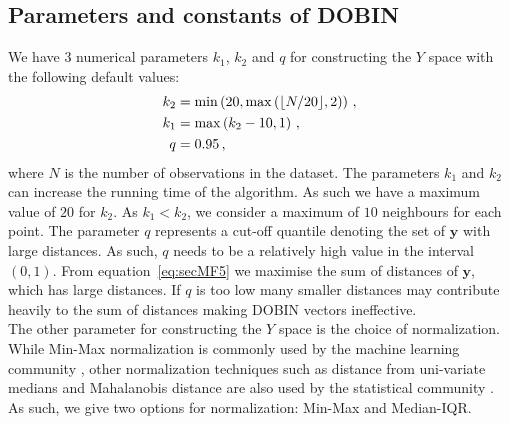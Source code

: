 \documentclass[11pt]{article}
\begin{document}
\subsection{Parameters and constants of DOBIN}\label{sec:MathFrame4}
We have $3$ numerical parameters $k_1$, $k_2$ and $q$ for constructing the $Y$ space with the following default values:
\begin{align} \label{eq:secMF15}
   k_2  & = \min\left(20, \max \left( \lfloor N/20 \rfloor ,2 \right )  \right) \notag  \, , \\
   k_1  & = \max \left( k_2-10, 1 \right) \, , \\
   q    & = 0.95 \notag \, , 
\end{align}
where $N$ is the number of observations in the dataset. The parameters $k_1$ and $k_2$ can increase the running time of the algorithm. As such we have a maximum value of $20$ for $k_2$.  As $k_1 < k_2$, we consider a maximum of $10$ neighbours for each point. The parameter $q$ represents a  cut-off quantile denoting the set of $\bm{y}$ with large distances. As such, $q$ needs to be a relatively high value in the interval $(0,1)$. From equation~\eqref{eq:secMF5} we maximise the sum of distances of $\bm{y}$, which has large distances. If $q$ is too low many smaller distances may contribute heavily to the sum of distances making DOBIN vectors ineffective.  \\

The other parameter for constructing the $Y$ space is the choice of normalization. While Min-Max normalization is commonly used by the machine learning community \citep{campos2016evaluation}, other normalization techniques such as distance from uni-variate medians and Mahalanobis distance are also used by the statistical community \citep{billor2000bacon}.  As such, we give two options for normalization: Min-Max and Median-IQR.  \\
\end{document}
